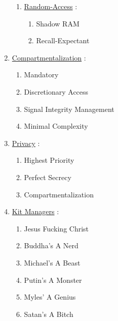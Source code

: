 \documentclass[11pt]{article}
\begin{document}
\begin{enumerate}
\begin{enumerate}
		\item[] \ul{Random-Access} :
		\begin{enumerate}
			\item[] Shadow RAM
			\item[] Recall-Expectant
		\end{enumerate}
	\end{enumerate}

	\item[] \ul{Compartmentalization} :
	\begin{enumerate}
		\item[] Mandatory
		\item[] Discretionary Access
		\item[] Signal Integrity Management
		\item[] Minimal Complexity
	\end{enumerate}

	\item[] \ul{Privacy} :
	\begin{enumerate}
		\item[] Highest Priority
		\item[] Perfect Secrecy
		\item[] Compartmentalization
	\end{enumerate}

	\item[] \ul{Kit Managers} :
	\begin{enumerate}
		\item[] Jesus Fucking Christ
		\item[] Buddha's A Nerd
		\item[] Michael's A Beast
		\item[] Putin's A Monster
		\item[] Myles' A Genius
		\item[] Satan's A Bitch
	\end{enumerate}

\end{enumerate}
\end{document}
